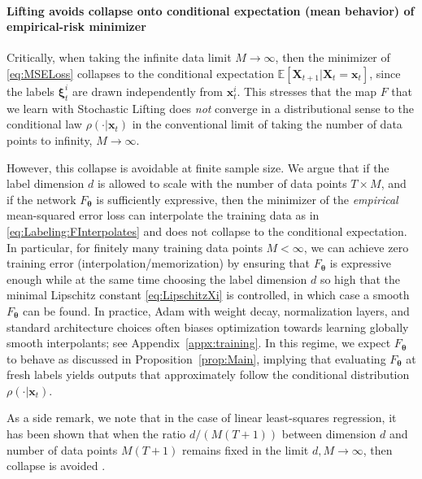 \documentclass{article}
\theoremstyle{plain}
\theoremstyle{definition}
\theoremstyle{remark}
\newcommand{\ldim}{d} %
\newcommand{\bfxi}{{\bm \xi}}
\newcommand{\bftheta}{\bm{\theta}}
\newcommand{\x}{\bm{x}}
\newcommand{\X}{\bm{X}}
\newcommand{\bfx}{\bm{x}}
\begin{document}
\paragraph{Lifting avoids collapse onto conditional expectation (mean behavior) of empirical-risk minimizer}
Critically, when taking the infinite data limit $M \to \infty$, then the minimizer of \eqref{eq:MSELoss} collapses to the conditional expectation $\mathbb E \left[ \X_{t+1} | \X_t = \x_t \right]$, since the labels $\bfxi_t^{i}$ are drawn independently from $\bfx_t^{i}$. This stresses that the map $F$ that we learn with Stochastic Lifting does \emph{not} converge in a distributional sense to the conditional law $\rho(\cdot | \x_t)$ in the conventional limit of taking the number of data points to infinity, $M \to \infty$.

However, this collapse is avoidable at finite sample size. We argue that if the label dimension $\ldim$ is allowed to scale with the number of data points $T \times M$, and if the network $F_{\bftheta}$ is sufficiently expressive, then the minimizer of the \emph{empirical} mean-squared error loss can interpolate the training data as in \eqref{eq:Labeling:FInterpolates} and does not collapse to the conditional expectation.
In particular, for finitely many training data points $M < \infty$, we can achieve zero training error (interpolation/memorization) by ensuring that $F_{\bftheta}$ is expressive enough while at the same time choosing the label dimension $\ldim$ so high that the minimal Lipschitz constant \eqref{eq:LipschitzXi} is controlled, in which case a smooth $F_{\bftheta}$ can be found. In practice, Adam with weight decay, normalization layers, and standard architecture choices often biases optimization towards learning globally smooth interpolants; see Appendix~\ref{appx:training}.
In this regime, we expect $F_{\bftheta}$ to behave as discussed in  Proposition~\ref{prop:Main}, implying that evaluating $F_{\bftheta}$ at fresh labels yields outputs that approximately follow the conditional distribution $\rho(\cdot | \x_t)$. 

As a side remark, we note that in the case of linear least-squares regression, it has been shown that when the ratio $\ldim/(M  (T + 1))$ between dimension $\ldim$ and number of data points $M  (T + 1)$ remains fixed in the limit $\ldim, M \to \infty$, then collapse is avoided \cite{10.1214/21-AOS2133}.
\end{document}
